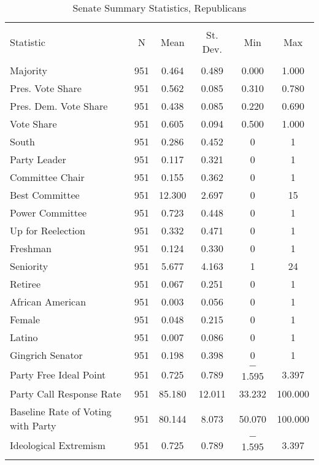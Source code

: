 \documentclass[12pt]{article}
\begin{document}
\begin{table}[!htbp] \centering 
	\caption{Senate Summary Statistics, Republicans} 
	\label{} 
	\begin{tabular}{@{\extracolsep{5pt}}lccccc} 
		\\[-1.8ex]\hline 
		\hline \\[-1.8ex] 
		Statistic & \multicolumn{1}{c}{N} & \multicolumn{1}{c}{Mean} & \multicolumn{1}{c}{St. Dev.} & \multicolumn{1}{c}{Min} & \multicolumn{1}{c}{Max} \\ 
		\hline \\[-1.8ex] 
		Majority & 951 & 0.464 & 0.489 & 0.000 & 1.000 \\ 
		Pres. Vote Share & 951 & 0.562 & 0.085 & 0.310 & 0.780 \\ 
		Pres. Dem. Vote Share & 951 & 0.438 & 0.085 & 0.220 & 0.690 \\ 
		Vote Share & 951 & 0.605 & 0.094 & 0.500 & 1.000 \\ 
		South & 951 & 0.286 & 0.452 & 0 & 1 \\  
		Party Leader & 951 & 0.117 & 0.321 & 0 & 1 \\ 
		Committee Chair & 951 & 0.155 & 0.362 & 0 & 1 \\ 
		Best Committee & 951 & 12.300 & 2.697 & 0 & 15 \\ 
		Power Committee & 951 & 0.723 & 0.448 & 0 & 1 \\ 
		Up for Reelection & 951 & 0.332 & 0.471 & 0 & 1 \\ 
		Freshman & 951 & 0.124 & 0.330 & 0 & 1 \\ 
		Seniority & 951 & 5.677 & 4.163 & 1 & 24 \\ 
		Retiree & 951 & 0.067 & 0.251 & 0 & 1 \\ 
		African American & 951 & 0.003 & 0.056 & 0 & 1 \\ 
		Female & 951 & 0.048 & 0.215 & 0 & 1 \\ 
		Latino & 951 & 0.007 & 0.086 & 0 & 1 \\ 
		Gingrich Senator & 951 & 0.198 & 0.398 & 0 & 1 \\ 
		Party Free Ideal Point & 951 & 0.725 & 0.789 & $-$1.595 & 3.397 \\ 
		Party Call Response Rate & 951 & 85.180 & 12.011 & 33.232 & 100.000 \\ 
		Baseline Rate of Voting with Party & 951 & 80.144 & 8.073 & 50.070 & 100.000 \\ 
		Ideological Extremism & 951 & 0.725 & 0.789 & $-$1.595 & 3.397 \\ 
		\hline \\[-1.8ex] 
	\end{tabular} 
\end{table} 
\end{document}
